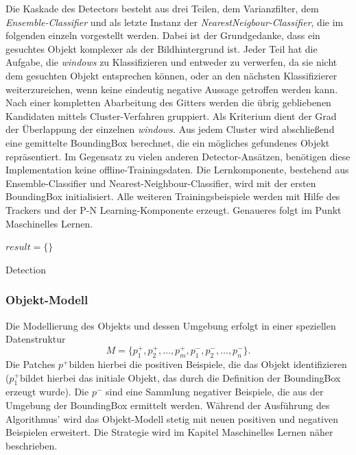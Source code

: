 	Die Kaskade des Detectors besteht aus drei Teilen, dem Varianzfilter, dem \textit{Ensemble-Classifier} und als letzte Instanz der \textit{NearestNeigbour-Classifier}, die im folgenden einzeln vorgestellt werden. Dabei ist der Grundgedanke, dass ein gesuchtes Objekt komplexer als der Bildhintergrund ist. Jeder Teil hat die Aufgabe, die \textit{windows} zu Klassifizieren und entweder zu verwerfen, da sie nicht dem gesuchten Objekt entsprechen können, oder an den nächsten Klassifizierer weiterzureichen, wenn keine eindeutig negative Aussage getroffen werden kann. Nach einer kompletten Abarbeitung des Gitters werden die übrig gebliebenen Kandidaten mittels Cluster-Verfahren gruppiert. Als Kriterium dient der Grad der Überlappung der einzelnen \textit{windows.} Aus jedem Cluster wird abschließend eine gemittelte BoundingBox berechnet, die ein mögliches gefundenes Objekt repräsentiert. Im Gegensatz zu vielen anderen Detector-Ansätzen, benötigen diese Implementation keine offline-Trainingsdaten. Die Lernkomponente, bestehend aus Ensemble-Classifier und Nearest-Neighbour-Classifier, wird mit der ersten BoundingBox initialisiert. Alle weiteren Trainingsbeispiele werden mit Hilfe des Trackers und der P-N Learning-Komponente erzeugt. Genaueres folgt im Punkt Maschinelles Lernen.

	\begin{algorithm}
	\vspace{0.2cm}
	$result = \{\}$\;
	\caption{Detection}
	\label{alg:detection}
	\vspace{0.2cm}
	\end{algorithm}

	\subsubsection{Objekt-Modell}
	Die Modellierung des Objekts und dessen Umgebung erfolgt in einer speziellen Datenstruktur
	\begin{equation}
	M=\{p_{1}^{+},p_{2}^{+},\dots,p_{m}^{+},p_{1}^{-},p_{2}^{-},\dots,p_{n}^{-}\}.
	\end{equation}
	Die Patches $p^{+}$bilden hierbei die positiven Beispiele, die das Objekt identifizieren ($p_{1}^{+}$bildet hierbei das initiale Objekt, das durch die Definition der BoundingBox erzeugt wurde). Die $p^{-}$ sind eine Sammlung negativer Beispiele, die aus der Umgebung der BoundingBox ermittelt werden. Während der Ausführung des Algorithmus' wird das Objekt-Modell stetig mit neuen positiven und negativen Beispielen erweitert. Die Strategie wird im Kapitel Maschinelles Lernen näher beschrieben.

